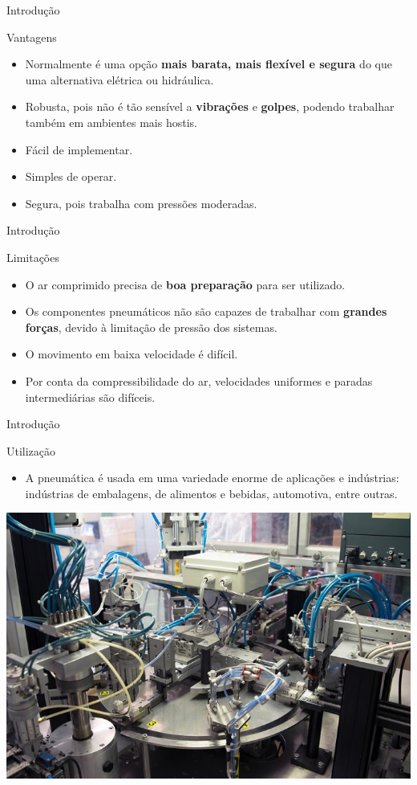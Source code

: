 \begin{frame}{Introdução}
	\begin{block}{Vantagens}
		\begin{itemize}
			\item Normalmente é uma opção \textbf{mais barata, mais flexível e segura} do que uma alternativa elétrica ou hidráulica.
			\item Robusta, pois não é tão sensível a \textbf{vibrações} e \textbf{golpes}, podendo trabalhar também em ambientes mais hostis.
			\item Fácil de implementar.
			\item Simples de operar.
			\item Segura, pois trabalha com pressões moderadas.
		\end{itemize}
	\end{block}
\end{frame}


\begin{frame}{Introdução}
	\begin{block}{Limitações}
		\begin{itemize}
			\item O ar comprimido precisa de \textbf{boa preparação} para ser utilizado.
			\item Os componentes pneumáticos não são capazes de trabalhar com \textbf{grandes forças}, devido à limitação de pressão dos sistemas.
			\item O movimento em baixa velocidade é difícil.
			\item Por conta da compressibilidade do ar, velocidades uniformes e paradas intermediárias são difíceis.
		\end{itemize}
	\end{block}
\end{frame}


\begin{frame}{Introdução}
	\begin{block}{Utilização}
		\begin{itemize}
			\item A pneumática é usada em uma variedade enorme de aplicações e indústrias: indústrias de embalagens, de alimentos e bebidas, automotiva, entre outras.
		\end{itemize}
	\end{block}

\centering
\includegraphics[width=0.7\linewidth]{Figuras/Ch11/fig5}
\end{frame}


